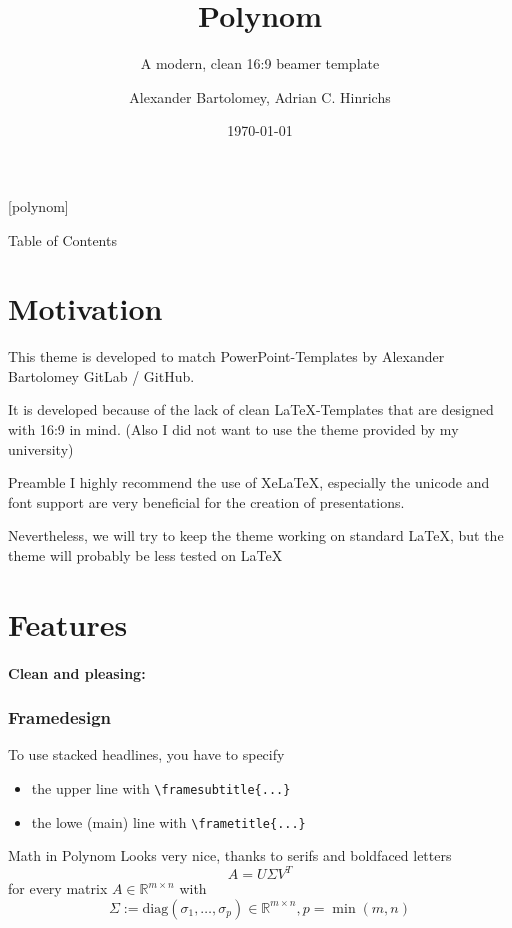 \documentclass[fragile=singleslide]{beamer}
\title{Polynom}
\subtitle{A modern, clean 16:9 beamer template}
\author{Alexander Bartolomey, Adrian C. Hinrichs}
\date{\today}
\begin{document}
[polynom]{}
\begin{frame}
  \titlepage
\end{frame}

\begin{frame}{Table of Contents}
  \tableofcontents
\end{frame}


\section{Motivation}
\begin{frame}
  This theme is developed to match PowerPoint-Templates by Alexander
  Bartolomey GitLab / GitHub.

  It is developed because of the lack of clean \LaTeX-Templates that
  are designed with 16:9 in mind.  (Also I did not want to use the
  theme provided by my university)
\end{frame}

\begin{frame}{Preamble}
  I highly recommend the use of XeLaTeX, especially the unicode and
  font support are very beneficial for the creation of presentations.

  Nevertheless, we will try to keep the theme working on standard
  \LaTeX, but the theme will probably be less tested on \LaTeX
\end{frame}

\section{Features}
\begin{frame}[fragile=singleslide]
  \framesubtitle{Clean and pleasing:}
  \frametitle{Framedesign}
  To use stacked headlines, you have to specify
  \begin{itemize}
  \item the upper line with \verb|\framesubtitle{...}|
  \item the lowe (main) line with \verb|\frametitle{...}|
  \end{itemize}
\end{frame}

\begin{frame}{Math in Polynom}
  Looks very nice, thanks to serifs and boldfaced letters
   \[ A=U\Sigma V^T\]
   for every matrix \( A\in \mathbb{R}^{m\times n}\) with
   \[\Sigma:=\mathrm{diag}(\sigma_1,\dots,\sigma_p) \in \mathbb{R}^{m\times n}, p = \min(m,n)\]
\end{frame}
\end{document}

